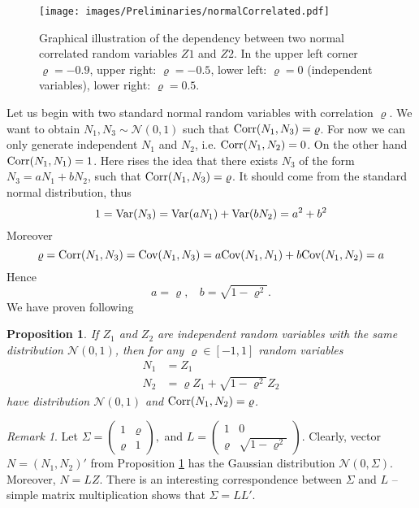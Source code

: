 \documentclass[a4paper,11pt, twoside]{book}
\newtheorem{prop}[thm]{Proposition}
\theoremstyle{definition}
\theoremstyle{remark}
\newtheorem{remark}{Remark}[chapter]
\def\Var{{\rm Var}}
\def\Cov{{\hbox{Cov}}}
\def\Corr{{\hbox{Corr}}}
\begin{document}
\begin{figure}
\centering
 \texttt{[image: images/Preliminaries/normalCorrelated.pdf]}
\caption{Graphical illustration of the dependency between two normal correlated random variables $Z1$ and $Z2$. In the upper left corner $\varrho = -0.9$, upper right: $\varrho = -0.5$, lower left: $\varrho = 0$ (independent variables), lower right: $\varrho = 0.5$.}
\end{figure}

Let us begin with two standard normal random variables with correlation $\varrho$. We want to obtain $N_1, N_3 \sim \mathcal{N}(0,1)$ such that $\Corr(N_1, N_3) = \varrho$.  For now we can only generate independent $N_1$ and $N_2$, i.e. $\Corr(N_1, N_2) = 0$. On the other hand $\Corr(N_1, N_1) = 1$. Here rises the idea that there exists $N_3$ of the form $N_3 = a N_1 + b N_2$, such that $\Corr(N_1, N_3) = \varrho$.
It should come from the standard normal distribution, thus
\[ 1 = \Var(N_3) = \Var( a N_1) +  \Var(b N_2) = a^2 + b^2 \]
Moreover
\[ \varrho = \Corr(N_1, N_3) = \Cov(N_1, N_3) = a\Cov(N_1, N_1) + b\Cov(N_1, N_2) = a \]
Hence
\[ a = \varrho,\ \ \ \ b = \sqrt{1 - \varrho^2}. \]
We have proven following
\begin{prop}
 \label{prop:corrNorm}
 If $Z_1$ and $Z_2$ are independent random variables with the same distribution $\mathcal{N}(0,1)$, then for any $\varrho \in [-1,1]$ random variables
 \begin{align*}
 N_1 &= Z_1 \\
 N_2 &= \varrho Z_1 + \sqrt{1 - \varrho^2} Z_2
 \end{align*}
 have distribution $\mathcal{N}(0,1)$ and $\Corr(N_1, N_2) = \varrho$.
\end{prop}

\begin{remark}
 Let $\Sigma = \left( \begin{array}{cc}
                    1    & \varrho \\
                    \varrho & 1
                    \end{array} \right),$
  and $L = \left( \begin{array}{cc}
                    1    & 0 \\
                    \varrho & \sqrt{1 - \varrho^2}
                    \end{array} \right).$
 Clearly, vector $N = (N_1, N_2)'$ from Proposition \ref{prop:corrNorm} has the Gaussian distribution $\mathcal{N}(0, \Sigma)$. Moreover, $N = LZ$. There is an interesting correspondence between $\Sigma$ and $L$ -- simple matrix multiplication shows that $\Sigma = LL'$.  
\end{remark}
\end{document}
